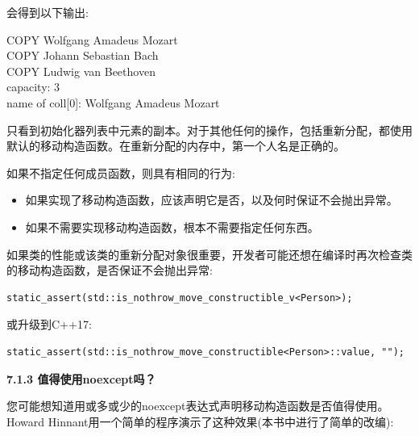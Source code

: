 会得到以下输出:\par

\begin{tcolorbox}[colback=white,colframe=black]
COPY Wolfgang Amadeus Mozart \\
COPY Johann Sebastian Bach \\
COPY Ludwig van Beethoven \\
capacity: 3 \\
name of coll[0]: Wolfgang Amadeus Mozart
\end{tcolorbox}

只看到初始化器列表中元素的副本。对于其他任何的操作，包括重新分配，都使用默认的移动构造函数。在重新分配的内存中，第一个人名是正确的。\par

如果不指定任何成员函数，则具有相同的行为:\par

\begin{itemize}
	\item 如果实现了移动构造函数，应该声明它是否，以及何时保证不会抛出异常。
	\item 如果不需要实现移动构造函数，根本不需要指定任何东西。
\end{itemize}

如果类的性能或该类的重新分配对象很重要，开发者可能还想在编译时再次检查类的移动构造函数，是否保证不会抛出异常:\par

\begin{lstlisting}[caption={}]
static_assert(std::is_nothrow_move_constructible_v<Person>);
\end{lstlisting}

或升级到C++17:\par

\begin{lstlisting}[caption={}]
static_assert(std::is_nothrow_move_constructible<Person>::value, "");
\end{lstlisting}

\hspace*{\fill} \par %
\textbf{7.1.3 值得使用noexcept吗？}

您可能想知道用或多或少的noexcept表达式声明移动构造函数是否值得使用。Howard Hinnant用一个简单的程序演示了这种效果(本书中进行了简单的改编):\par

{\color{red}{basics/movenoexcept.cpp}}\par

